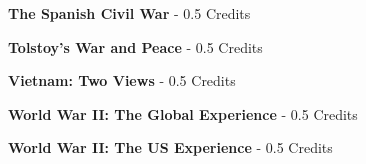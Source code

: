 \vspace{3mm}\noindent\textbf{  The Spanish Civil War   }  - 0.5 Credits

\vspace{3mm}\noindent\textbf{  Tolstoy's War and Peace   }  - 0.5 Credits

\vspace{3mm}\noindent\textbf{  Vietnam: Two Views   }  - 0.5 Credits

\vspace{3mm}\noindent\textbf{  World War II:  The Global Experience   }  - 0.5
 Credits
 
\vspace{3mm}\noindent\textbf{  World War II:  The US Experience}  - 0.5 Credits




